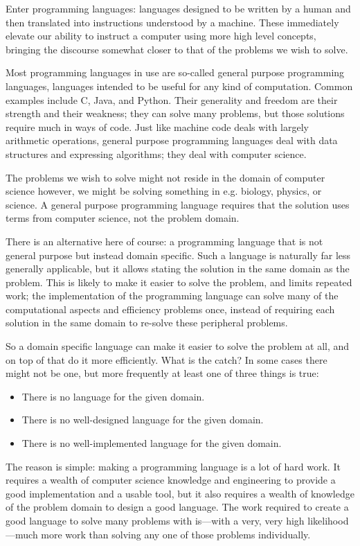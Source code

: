 \documentclass{kththesis}
\begin{document}
Enter programming languages: languages designed to be written by a human and then translated into instructions understood by a machine. These immediately elevate our ability to instruct a computer using more high level concepts, bringing the discourse somewhat closer to that of the problems we wish to solve.

Most programming languages in use are so-called general purpose programming languages, languages intended to be useful for any kind of computation. Common examples include C, Java, and Python. Their generality and freedom are their strength and their weakness; they can solve many problems, but those solutions require much in ways of code. Just like machine code deals with largely arithmetic operations, general purpose programming languages deal with data structures and expressing algorithms; they deal with computer science.

The problems we wish to solve might not reside in the domain of computer science however, we might be solving something in e.g. biology, physics, or science. A general purpose programming language requires that the solution uses terms from computer science, not the problem domain.

There is an alternative here of course: a programming language that is not general purpose but instead domain specific. Such a language is naturally far less generally applicable, but it allows stating the solution in the same domain as the problem. This is likely to make it easier to solve the problem, and limits repeated work; the implementation of the programming language can solve many of the computational aspects and efficiency problems once, instead of requiring each solution in the same domain to re-solve these peripheral problems.

So a domain specific language can make it easier to solve the problem at all, and on top of that do it more efficiently. What is the catch? In some cases there might not be one, but more frequently at least one of three things is true:

\begin{itemize}
  \item There is no language for the given domain.
  \item There is no well-designed language for the given domain.
  \item There is no well-implemented language for the given domain.
\end{itemize}

The reason is simple: making a programming language is a lot of hard work. It requires a wealth of computer science knowledge and engineering to provide a good implementation and a usable tool, but it also requires a wealth of knowledge of the problem domain to design a good language. The work required to create a good language to solve many problems with is---with a very, very high likelihood---much more work than solving any one of those problems individually.
\end{document}
